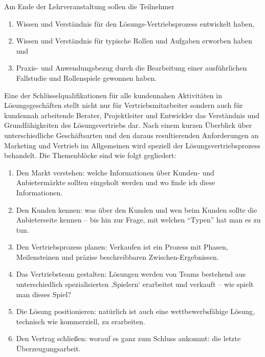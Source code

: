 \begin{course}
\begin{learningoutcomes}
Am Ende der Lehrveranstaltung sollen die Teilnehmer

 \begin{enumerate}\item Wissen und Verständnis für den Lösungs-Vertriebsprozess entwickelt haben,  \item Wissen und Verständnis für typische Rollen und Aufgaben erworben haben und  \item Praxis- und Anwendungsbezug durch die Bearbeitung einer ausführlichen Fallstudie und Rollenspiele gewonnen haben.  \end{enumerate}
\end{learningoutcomes}

\begin{content}
Eine der Schlüsselqualifikationen für alle kundennahen Aktivitäten in Lösungsgeschäften stellt nicht nur für Vertriebsmitarbeiter sondern auch für kundennah arbeitende Berater, Projektleiter und Entwickler das Verständnis und Grundfähigkeiten des Lösungsvertriebs dar.\newline
Nach einem kurzen Überblick über unterschiedliche Geschäftsarten und den daraus resultierenden Anforderungen an Marketing und Vertrieb im Allgemeinen wird speziell der Lösungsvertriebsprozess behandelt.\newline
\newline
Die Themenblöcke sind wie folgt gegliedert:

 \begin{enumerate}\item Den Markt verstehen: welche Informationen über Kunden- und Anbietermärkte sollten eingeholt werden und wo finde ich diese Informationen.  \item Den Kunden kennen: was über den Kunden und wen beim Kunden sollte die Anbieterseite kennen – bis hin zur Frage, mit welchen “Typen” hat man es zu tun.  \item Den Vertriebsprozess planen: Verkaufen ist ein Prozess mit Phasen, Meilensteinen und präzise beschreibbaren Zwischen-Ergebnissen.  \item Das Vertriebsteam gestalten: Lösungen werden von Teams bestehend aus unterschiedlich spezialisierten ‚Spielern‘ erarbeitet und verkauft – wie spielt man dieses Spiel?  \item Die Lösung positionieren: natürlich ist auch eine wettbewerbsfähige Lösung, technisch wie kommerziell, zu erarbeiten.  \item Den Vertrag schließen: worauf es ganz zum Schluss ankommt: die letzte Überzeugungsarbeit.  \end{enumerate}


\end{content}
\end{course}
